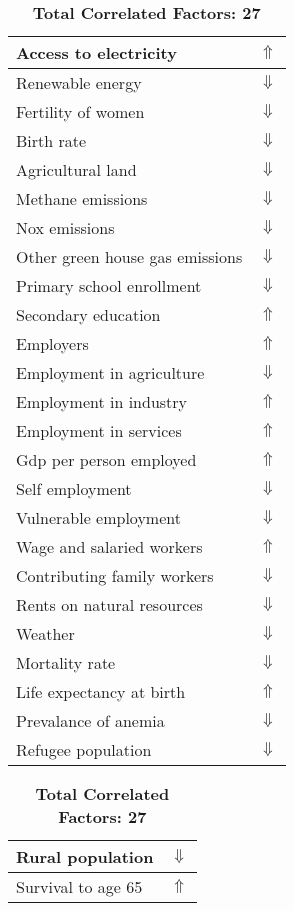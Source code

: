 \documentclass[12pt,notitlepage,oneside]{report}
\begin{document}
\clearpage
\begin{table}[!htb]
\caption{\textbf{Shows Symptom: Runny nose $\Uparrow$}}
\centering
\label{Correlated Socio-economic Factors0}
\begin{tabular}{|l|l|}
\hline
Access to electricity & $\Uparrow$\\ \hline
Renewable energy & $\Downarrow$\\ \hline
Fertility of women & $\Downarrow$\\ \hline
Birth rate & $\Downarrow$\\ \hline
Agricultural land & $\Downarrow$\\ \hline
Methane emissions & $\Downarrow$\\ \hline
Nox emissions & $\Downarrow$\\ \hline
Other green house gas emissions & $\Downarrow$\\ \hline
Primary school enrollment & $\Downarrow$\\ \hline
Secondary education & $\Uparrow$\\ \hline
Employers & $\Uparrow$\\ \hline
Employment in agriculture & $\Downarrow$\\ \hline
Employment in industry & $\Uparrow$\\ \hline
Employment in services & $\Uparrow$\\ \hline
Gdp per person employed & $\Uparrow$\\ \hline
Self employment & $\Downarrow$\\ \hline
Vulnerable employment & $\Downarrow$\\ \hline
Wage and salaried workers & $\Uparrow$\\ \hline
Contributing family workers & $\Downarrow$\\ \hline
Rents on natural resources & $\Downarrow$\\ \hline
Weather & $\Downarrow$\\ \hline
Mortality rate & $\Downarrow$\\ \hline
Life expectancy at birth & $\Uparrow$\\ \hline
Prevalance of anemia & $\Downarrow$\\ \hline
Refugee population & $\Downarrow$\\ \hline
\end{tabular}
\begin{tabular}{|l|l|}
\hline
Rural population & $\Downarrow$\\ \hline
Survival to age 65 & $\Uparrow$\\ \hline
\end{tabular}
\caption*{\textbf{Total Correlated Factors: 27}}
\end{table}
\end{document}
